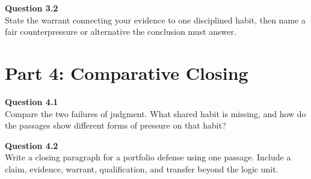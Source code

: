 \documentclass[12pt]{article}
\begin{document}
\textbf{Question 3.2}\\[-0.15em]
State the warrant connecting your evidence to one disciplined habit, then name a fair counterpressure or alternative the conclusion must answer.

\newpage
\section*{Part 4: Comparative Closing}
\textbf{Question 4.1}\\[-0.15em]
Compare the two failures of judgment. What shared habit is missing, and how do the passages show different forms of pressure on that habit?

\textbf{Question 4.2}\\[-0.15em]
Write a closing paragraph for a portfolio defense using one passage. Include a claim, evidence, warrant, qualification, and transfer beyond the logic unit.
\end{document}
